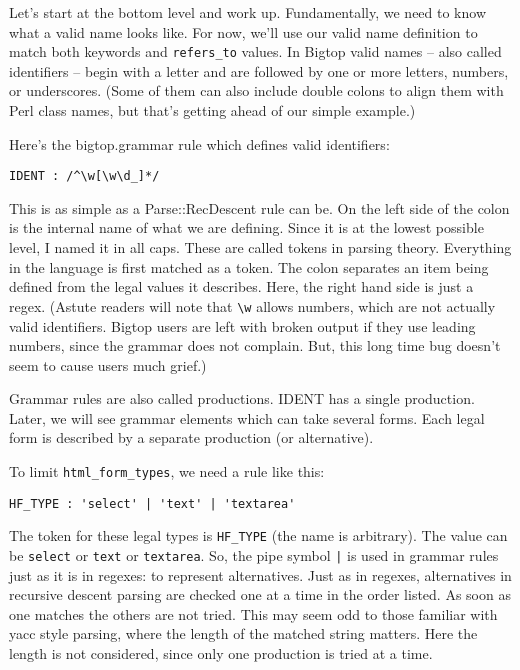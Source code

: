 Let's start at the bottom level and work up.  Fundamentally, we need
to know what a valid name looks like.  For now, we'll use our valid name
definition to match both keywords and \verb+refers_to+ values.  In Bigtop
valid names -- also called identifiers -- begin with a letter and are
followed by one or more letters, numbers, or underscores.  (Some of them can
also include double colons to align them with Perl class names, but that's
getting ahead of our simple example.)

Here's the bigtop.grammar rule which defines valid identifiers:

\begin{verbatim}
IDENT : /^\w[\w\d_]*/
\end{verbatim}

This is as simple as a Parse::RecDescent rule can be.  On the left side
of the colon is the internal name of what we are defining.  Since it
is at the lowest possible level, I named it in all caps.  These are called
tokens in parsing theory.  Everything in the language is first matched
as a token.  The colon separates an item being defined from the legal
values it describes.  Here, the right hand side is just a regex.  (Astute
readers will note that \verb+\w+ allows numbers, which are not actually
valid identifiers.  Bigtop users are left with broken output if they
use leading numbers, since the grammar does not complain.  But, this long
time bug doesn't seem to cause users much grief.)

Grammar rules are also called productions.  IDENT has a single production.
Later, we will see grammar elements which can take several forms.  Each
legal form is described by a separate production (or alternative).

To limit \verb+html_form_types+, we need a rule like this:

\begin{verbatim}
HF_TYPE : 'select' | 'text' | 'textarea'
\end{verbatim}

The token for these legal types is \verb+HF_TYPE+ (the name is arbitrary).
The value can be \verb+select+ or \verb+text+ or \verb+textarea+.  So,
the pipe symbol \verb+|+ is used in grammar rules just as it is in regexes:
to represent alternatives.  Just as in regexes, alternatives in recursive
descent parsing are checked one at a time in the order listed.  As
soon as one matches the others are not tried.  This may seem odd to those
familiar with yacc style parsing, where the length of the matched string
matters.  Here the length is not considered, since only one production
is tried at a time.

